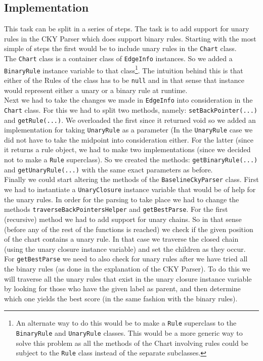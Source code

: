 \documentclass[11pt]{article}
\begin{document}
\subsection{Implementation}
This task can be split in a series of steps. The task is to add support for unary rules in the CKY Parser which does support binary rules. Starting with the most simple of steps the first would be to include unary rules in the \texttt{Chart} class.\\
The \texttt{Chart} class is a container class of \texttt{EdgeInfo} instances. So we added a \texttt{BinaryRule} instance variable to that class\footnote{An alternate way to do this would be to make a \texttt{Rule} superclass to the \texttt{BinaryRule} and \texttt{UnaryRule} classes. This would be a more generic way to solve this problem as all the methods of the Chart involving rules could be subject to the \texttt{Rule} class instead of the separate subclasses.}. The intuition behind this is that either of the Rules of the class has to be \texttt{null} and in that sense that instance would represent either a unary or a binary rule at runtime.\\ %
Next we had to take the changes we made in \texttt{EdgeInfo} into consideration in the \texttt{Chart} class. For this we had to split two methods, namely: \texttt{setBackPointer(...)} and \texttt{getRule(...)}. We overloaded the first since it returned void so we added an implementation for taking \texttt{UnaryRule} as a parameter (In the \texttt{UnaryRule} case we did not have to take the midpoint into consideration either. For the latter (since it returns a rule object, we had to make two implementations (since we decided not to make a \texttt{Rule} superclass). So we created the methods: \texttt{getBinaryRule(...)} and \texttt{getUnaryRule(...)} with the same exact parameters as before.\\
Finally we could start altering the methods of the \texttt{BaselineCkyParser} class. First we had to instantiate a \texttt{UnaryClosure} instance variable that would be of help for the unary rules. In order for the parsing to take place we had to change the methods \texttt{traverseBackPointersHelper} and \texttt{getBestParse}.
For the first (recursive) method we had to add support for unary chains. So in that sense (before any of the rest of the functions is reached) we check if the given position of the chart contains a unary rule. In that case we traverse the closed chain (using the unary closure instance variable) and set the children as they occur.\\
For \texttt{getBestParse} we need to also check for unary rules after we have tried all the binary rules (as done in the explanation of the CKY Parser). To do this we will traverse all the unary rules that exist in the unary closure instance variable by looking for those who have the given label as parent, and then determine which one yields the best score (in the same fashion with the binary rules).\\
\end{document}
